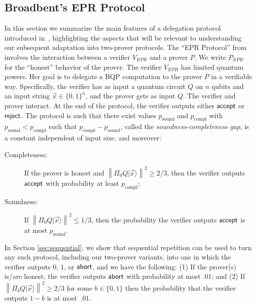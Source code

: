 \documentclass[11pt,letter]{article}
\theoremstyle{remark}
\theoremstyle{definition}
\newcommand{\ket}[1]{|#1\rangle}
\newcommand{\bra}[1]{\langle#1|}
\newcommand{\proj}[1]{\ket{#1}\!\bra{#1}}
\newcommand{\norm}[1]{\left\|#1\right\|}
\begin{document}



\subsection{Broadbent's EPR Protocol}
\label{sec:EPR-protocol}


In this section we summarize the main features of a delegation protocol introduced in~\cite{broadbent15howtoverify}, highlighting the aspects that will be relevant to understanding our subsequent adaptation into two-prover protocols. The ``EPR Protocol'' from \cite{broadbent15howtoverify} involves the interaction between a verifier $V_{EPR}$ and a prover $P$. We write $P_{EPR}$ for the ``honest'' behavior of the prover. The verifier $V_{EPR}$ has limited quantum powers. Her goal is to delegate a BQP computation to the prover $P$ in a verifiable way. Specifically, the verifier has as input a quantum circuit $Q$ on $n$ qubits and an input string $\vec{x}\in\{0,1\}^n$, and the prover gets as input $Q$. The verifier and prover interact. At the end of the protocol, the verifier outputs either $\sf accept$ or $\sf reject$. The protocol is such that there exist values $p_{\mathrm{sound}}$ and $p_{\mathrm{compl}}$ with $p_{\mathrm{sound}}< p_{\mathrm{compl}}$ such that $p_{\mathrm{compl}}-p_{\mathrm{sound}}$, called the \emph{soundness-completeness gap}, is a constant independent of input size, and moreover:

\begin{description}
\item[Completeness:] If the prover is honest and $\norm{\Pi_0Q\ket{\vec{x}}}^2 \geq 2/3$, then the verifier outputs $\sf accept$ with probability at least $p_{\mathrm{compl}}$;  
\item[Soundness:] If $\norm{\Pi_0Q\ket{\vec{x}}}^2 \leq 1/3$, then the probability the verifier outputs $\sf accept$ is at most $p_{\mathrm{sound}}$.
\end{description}

In Section \ref{sec:sequential}, we show that sequential repetition can be used to turn any such protocol, including our two-prover variants, into one in which the verifier outputs $0$, $1$, or $\sf abort$, and we have the following: (1) If the prover(s) is/are honest, the verifier outputs $\sf abort$ with probability at most $.01$; and (2) If $\norm{\Pi_b Q\ket{\vec{x}}}^2 \geq 2/3$ for some $b\in\{0,1\}$ then the probability that the verifier outputs $1-b$ is at most~$.01$.
\end{document}
